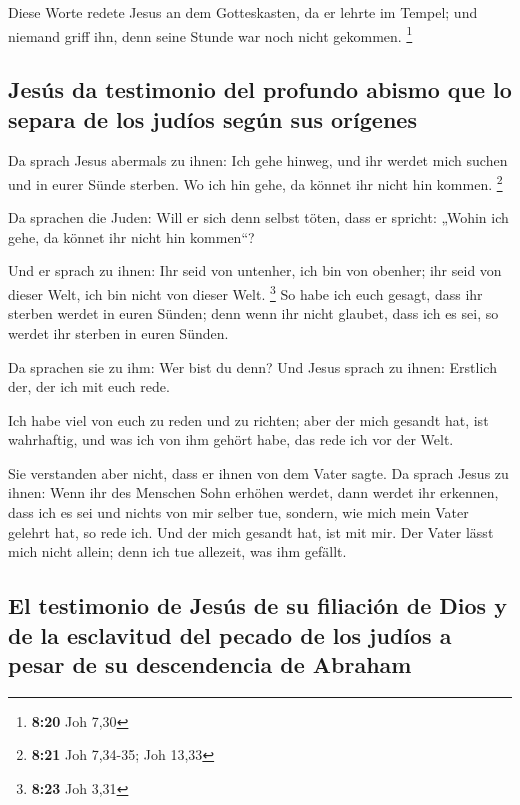  Diese Worte redete Jesus an dem Gotteskasten, da er
lehrte im Tempel; und niemand griff ihn, denn seine Stunde war noch
nicht gekommen. \footnote{\textbf{8:20} Joh 7,30}

\hypertarget{jesuxfas-da-testimonio-del-profundo-abismo-que-lo-separa-de-los-juduxedos-seguxfan-sus-oruxedgenes}{%
\subsection{Jesús da testimonio del profundo abismo que lo separa de los
judíos según sus
orígenes}\label{jesuxfas-da-testimonio-del-profundo-abismo-que-lo-separa-de-los-juduxedos-seguxfan-sus-oruxedgenes}}

 Da sprach Jesus abermals zu ihnen: Ich gehe hinweg, und
ihr werdet mich suchen und in eurer Sünde sterben. Wo ich hin gehe, da
könnet ihr nicht hin kommen. \footnote{\textbf{8:21} Joh 7,34-35; Joh
  13,33}

 Da sprachen die Juden: Will er sich denn selbst töten,
dass er spricht: „Wohin ich gehe, da könnet ihr nicht hin kommen``?

 Und er sprach zu ihnen: Ihr seid von untenher, ich bin
von obenher; ihr seid von dieser Welt, ich bin nicht von dieser Welt.
\footnote{\textbf{8:23} Joh 3,31}  So habe ich euch
gesagt, dass ihr sterben werdet in euren Sünden; denn wenn ihr nicht
glaubet, dass ich es sei, so werdet ihr sterben in euren Sünden.

 Da sprachen sie zu ihm: Wer bist du denn? Und Jesus
sprach zu ihnen: Erstlich der, der ich mit euch rede.

 Ich habe viel von euch zu reden und zu richten; aber der
mich gesandt hat, ist wahrhaftig, und was ich von ihm gehört habe, das
rede ich vor der Welt.

 Sie verstanden aber nicht, dass er ihnen von dem Vater
sagte.  Da sprach Jesus zu ihnen: Wenn ihr des Menschen
Sohn erhöhen werdet, dann werdet ihr erkennen, dass ich es sei und
nichts von mir selber tue, sondern, wie mich mein Vater gelehrt hat, so
rede ich.  Und der mich gesandt hat, ist mit mir. Der
Vater lässt mich nicht allein; denn ich tue allezeit, was ihm gefällt.

\hypertarget{el-testimonio-de-jesuxfas-de-su-filiaciuxf3n-de-dios-y-de-la-esclavitud-del-pecado-de-los-juduxedos-a-pesar-de-su-descendencia-de-abraham}{%
\subsection{El testimonio de Jesús de su filiación de Dios y de la
esclavitud del pecado de los judíos a pesar de su descendencia de
Abraham}\label{el-testimonio-de-jesuxfas-de-su-filiaciuxf3n-de-dios-y-de-la-esclavitud-del-pecado-de-los-juduxedos-a-pesar-de-su-descendencia-de-abraham}}

